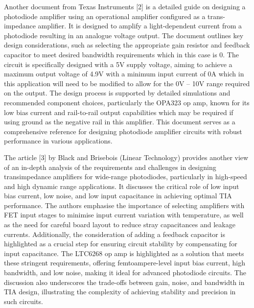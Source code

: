 \documentclass[conference]{IEEEtran}
\begin{document}
Another document from Texas Instruments [2] is a detailed guide on designing a photodiode amplifier using an operational amplifier configured as a trans-impedance amplifier. It is designed to amplify a light-dependent current from a photodiode resulting in an analogue voltage output. The document outlines key design considerations, such as selecting the appropriate gain resistor and feedback capacitor to meet desired bandwidth requirements which in this case is 0. The circuit is specifically designed with a 5V supply voltage, aiming to achieve a maximum output voltage of 4.9V with a minimum input current of 0A which in this application will need to be modified to allow for the 0V – 10V range required on the output. The design process is supported by detailed simulations and recommended component choices, particularly the OPA323 op amp, known for its low bias current and rail-to-rail output capabilities which may be required if using ground as the negative rail in this amplifier. This document serves as a comprehensive reference for designing photodiode amplifier circuits with robust performance in various applications.

The article [3] by Black and Brisebois (Linear Technology) provides another view of an in-depth analysis of the requirements and challenges in designing transimpedance amplifiers for wide-range photodiodes, particularly in high-speed and high dynamic range applications. It discusses the critical role of low input bias current, low noise, and low input capacitance in achieving optimal TIA performance. The authors emphasise the importance of selecting amplifiers with FET input stages to minimise input current variation with temperature, as well as the need for careful board layout to reduce stray capacitances and leakage currents. Additionally, the consideration of adding a feedback capacitor is highlighted as a crucial step for ensuring circuit stability by compensating for input capacitance. The LTC6268 op amp is highlighted as a solution that meets these stringent requirements, offering femtoampere-level input bias current, high bandwidth, and low noise, making it ideal for advanced photodiode circuits. The discussion also underscores the trade-offs between gain, noise, and bandwidth in TIA design, illustrating the complexity of achieving stability and precision in such circuits.
\end{document}
